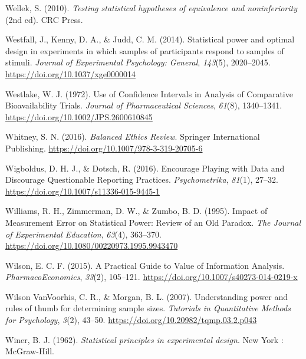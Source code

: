 \documentclass[
  letterpaper,
  DIV=11,
  numbers=noendperiod]{scrreprt}
\newlength{\cslhangindent}
\newlength{\cslentryspacingunit} %
\newenvironment{CSLReferences}[2] %
 {%
  \setlength{\parindent}{0pt}
  \ifodd #1
  \let\oldpar\par
  \def\par{\hangindent=\cslhangindent\oldpar}
  \fi
  \setlength{\parskip}{#2\cslentryspacingunit}
 }%
 {}
\begin{document}
\begin{CSLReferences}{1}{0}
\leavevmode{}%
Wellek, S. (2010). \emph{Testing statistical hypotheses of equivalence
and noninferiority} (2nd ed). {CRC Press}.

\leavevmode{}%
Westfall, J., Kenny, D. A., \& Judd, C. M. (2014). Statistical power and
optimal design in experiments in which samples of participants respond
to samples of stimuli. \emph{Journal of Experimental Psychology:
General}, \emph{143}(5), 2020--2045.
\url{https://doi.org/10.1037/xge0000014}

\leavevmode{}%
Westlake, W. J. (1972). Use of {Confidence Intervals} in {Analysis} of
{Comparative Bioavailability Trials}. \emph{Journal of Pharmaceutical
Sciences}, \emph{61}(8), 1340--1341.
\url{https://doi.org/10.1002/JPS.2600610845}

\leavevmode{}%
Whitney, S. N. (2016). \emph{Balanced {Ethics Review}}. {Springer
International Publishing}.
\url{https://doi.org/10.1007/978-3-319-20705-6}

\leavevmode{}%
Wigboldus, D. H. J., \& Dotsch, R. (2016). Encourage {Playing} with
{Data} and {Discourage Questionable Reporting Practices}.
\emph{Psychometrika}, \emph{81}(1), 27--32.
\url{https://doi.org/10.1007/s11336-015-9445-1}

\leavevmode{}%
Williams, R. H., Zimmerman, D. W., \& Zumbo, B. D. (1995). Impact of
{Measurement Error} on {Statistical Power}: {Review} of an {Old
Paradox}. \emph{The Journal of Experimental Education}, \emph{63}(4),
363--370. \url{https://doi.org/10.1080/00220973.1995.9943470}

\leavevmode{}%
Wilson, E. C. F. (2015). A {Practical Guide} to {Value} of {Information
Analysis}. \emph{PharmacoEconomics}, \emph{33}(2), 105--121.
\url{https://doi.org/10.1007/s40273-014-0219-x}

\leavevmode{}%
Wilson VanVoorhis, C. R., \& Morgan, B. L. (2007). Understanding power
and rules of thumb for determining sample sizes. \emph{Tutorials in
Quantitative Methods for Psychology}, \emph{3}(2), 43--50.
\url{https://doi.org/10.20982/tqmp.03.2.p043}

\leavevmode{}%
Winer, B. J. (1962). \emph{Statistical principles in experimental
design}. {New York : McGraw-Hill}.


\end{CSLReferences}
\end{document}
